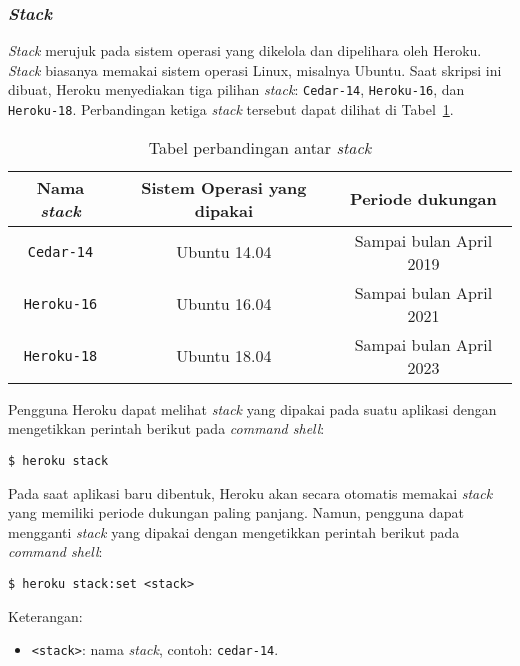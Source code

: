 \subsubsection{\textit{Stack}}
\textit{Stack} merujuk pada sistem operasi yang dikelola dan dipelihara oleh Heroku. \textit{Stack} biasanya memakai sistem operasi Linux, misalnya Ubuntu. Saat skripsi ini dibuat, Heroku menyediakan tiga pilihan \textit{stack}: \texttt{Cedar-14}, \texttt{Heroku-16}, dan \texttt{Heroku-18}. Perbandingan ketiga \textit{stack} tersebut dapat dilihat di Tabel~\ref{table:compare-stack}.
\begin{center}
	\begin{table}[H]
	\caption{Tabel perbandingan antar \textit{stack}}
	\label{table:compare-stack}
	\begin{tabular}{|c|c|c|}
	\hline
	Nama \textit{stack} & Sistem Operasi yang dipakai & Periode dukungan\\
	\hline
	\texttt{Cedar-14} & Ubuntu 14.04 & Sampai bulan April 2019\\
	\hline
	\texttt{Heroku-16} & Ubuntu 16.04 & Sampai bulan April 2021\\
	\hline
	\texttt{Heroku-18} & Ubuntu 18.04 & Sampai bulan April 2023\\
	\hline
	\end{tabular}
	\end{table}
\end{center}
Pengguna Heroku dapat melihat \textit{stack} yang dipakai pada suatu aplikasi dengan mengetikkan perintah berikut pada \textit{command shell}:
\begin{lstlisting}
$ heroku stack
\end{lstlisting}
Pada saat aplikasi baru dibentuk, Heroku akan secara otomatis memakai \textit{stack} yang memiliki periode dukungan paling panjang. Namun, pengguna dapat mengganti \textit{stack} yang dipakai dengan mengetikkan perintah berikut pada \textit{command shell}:
\begin{lstlisting}
$ heroku stack:set <stack>
\end{lstlisting}
Keterangan:
\begin{itemize}
\item \texttt{<stack>}: nama \textit{stack}, contoh: \texttt{cedar-14}.
\end{itemize}

